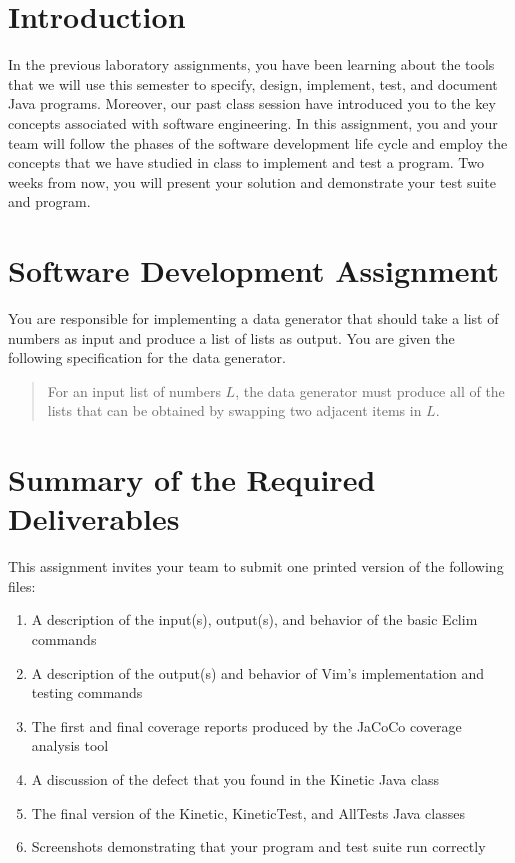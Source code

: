 

\usepackage[compact]{titlesec}



\section*{Introduction}

In the previous laboratory assignments, you have been learning about the tools that we will use this semester to
specify, design, implement, test, and document Java programs. Moreover, our past class session have introduced you to
the key concepts associated with software engineering.  In this assignment, you and your team will follow the phases of
the software development life cycle and employ the concepts that we have studied in class  to implement and test a
program. Two weeks from now, you will present your solution and demonstrate your test suite and program.

\section*{Software Development Assignment}

You are responsible for implementing a data generator that should take a list of numbers as input and produce a list of
lists as output.  You are given the following specification for the data generator.

\begin{quote}
For an input list of numbers $L$, the data generator must produce all of the lists that can be obtained by swapping two
adjacent items in $L$.
\end{quote} 	

\section*{Summary of the Required Deliverables}

This assignment invites your team to submit one printed version of the following files:

\begin{enumerate}
	
	\item A description of the input(s), output(s), and behavior of the basic Eclim commands 
	\item A description of the output(s) and behavior of Vim's implementation and testing commands
	\item The first and final coverage reports produced by the JaCoCo coverage analysis tool
	\item A discussion of the defect that you found in the Kinetic Java class
	\item The final version of the Kinetic, KineticTest, and AllTests Java classes
	\item Screenshots demonstrating that your program and test suite run correctly
\end{enumerate}

